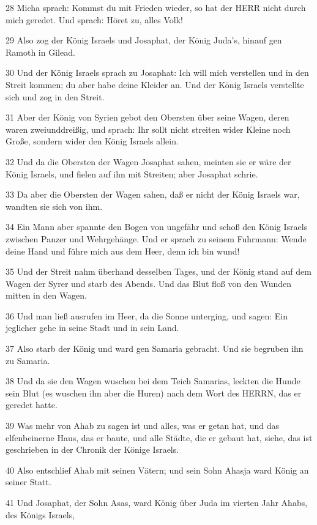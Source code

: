 \par 28 Micha sprach: Kommst du mit Frieden wieder, so hat der HERR nicht durch mich geredet. Und sprach: Höret zu, alles Volk!
\par 29 Also zog der König Israels und Josaphat, der König Juda's, hinauf gen Ramoth in Gilead.
\par 30 Und der König Israels sprach zu Josaphat: Ich will mich verstellen und in den Streit kommen; du aber habe deine Kleider an. Und der König Israels verstellte sich und zog in den Streit.
\par 31 Aber der König von Syrien gebot den Obersten über seine Wagen, deren waren zweiunddreißig, und sprach: Ihr sollt nicht streiten wider Kleine noch Große, sondern wider den König Israels allein.
\par 32 Und da die Obersten der Wagen Josaphat sahen, meinten sie er wäre der König Israels, und fielen auf ihn mit Streiten; aber Josaphat schrie.
\par 33 Da aber die Obersten der Wagen sahen, daß er nicht der König Israels war, wandten sie sich von ihm.
\par 34 Ein Mann aber spannte den Bogen von ungefähr und schoß den König Israels zwischen Panzer und Wehrgehänge. Und er sprach zu seinem Fuhrmann: Wende deine Hand und führe mich aus dem Heer, denn ich bin wund!
\par 35 Und der Streit nahm überhand desselben Tages, und der König stand auf dem Wagen der Syrer und starb des Abends. Und das Blut floß von den Wunden mitten in den Wagen.
\par 36 Und man ließ ausrufen im Heer, da die Sonne unterging, und sagen: Ein jeglicher gehe in seine Stadt und in sein Land.
\par 37 Also starb der König und ward gen Samaria gebracht. Und sie begruben ihn zu Samaria.
\par 38 Und da sie den Wagen wuschen bei dem Teich Samarias, leckten die Hunde sein Blut (es wuschen ihn aber die Huren) nach dem Wort des HERRN, das er geredet hatte.
\par 39 Was mehr von Ahab zu sagen ist und alles, was er getan hat, und das elfenbeinerne Haus, das er baute, und alle Städte, die er gebaut hat, siehe, das ist geschrieben in der Chronik der Könige Israels.
\par 40 Also entschlief Ahab mit seinen Vätern; und sein Sohn Ahasja ward König an seiner Statt.
\par 41 Und Josaphat, der Sohn Asas, ward König über Juda im vierten Jahr Ahabs, des Königs Israels,
